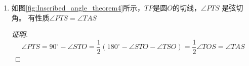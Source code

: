 \documentclass{article}
\begin{document}
\begin{enumerate}
\begin{figure}[!ht]
\begin{subfigure}[b]{0.45\textwidth}
    \caption{角平分线证明用图}\label{fig:Bisect}
    \end{subfigure}
    \end{figure}


一般的,去掉$\angle BAD = \angle DAC$的条件，在图\ref{fig:Bisect} 中有：
\[
\frac{BD}{DC}=\frac{AB\sin\angle DAB}{AC \sin\angle DAC}
\]
角平分线逆定理的证明如下：
\begin{proof}[证明]
在图\ref{fig:Bisect} 中，过$B$作$BB_1\perp AD$，垂足为$B_1$; 过$C$作$CC_1 \perp AD$,垂足为
$C_1$。因为$\triangle BB_1D \sim \triangle CC_1D$,所以$\frac{BD}{DC}=\frac{BB_1}{CC_1}$。
因为$\frac{BD}{DC}=\frac{AB}{AC}$,所以$\frac{BB_1}{CC_1}=\frac{AB}{AC}$。
即$\frac{BB_1}{AB}=\frac{CC_1}{AC}\Rightarrow \sin\angle BAD = \sin \angle CAD$。
因为$\angle BAD,\angle CAD$都是锐角，所以$\angle BAD=\angle CAD$。
\end{proof}
\begin{proof}[另证]
$$\frac{BD}{DC}=\frac{S_{\triangle ABD}}{S_{\triangle ADC}}=\frac{AB\cdot AD \cdot \sin\angle BAD}
{AC\cdot AD\cdot \sin\angle DAC}=\frac{AB}{AC}$$
\end{proof}
\textbf{作业：}证明角平分线定理。即在图\ref{fig:Triangle_ABC_with_bisector_AD} 中，已知
$\angle BAD = \angle DAC$,证明$\frac{BD}{DC}=\frac{AB}{AC}$。
\item 如图\ref{fig:Inscribed_angle_theorem4}所示，$TP$是圆$O$的切线，$\angle PTS$ 是弦切角。
有性质$\angle PTS=\angle TAS$
\begin{proof}[证明]
$$
\angle PTS = 90^{\circ}-\angle STO =\frac{1}{2}(180^{\circ}-\angle STO -\angle TSO)=\frac{1}{2}\angle TOS
=\angle TAS
$$
\end{proof}
    \begin{figure}[!ht]
    \centering
    \begin{subfigure}[b]{0.45\textwidth}

\end{subfigure}
\end{figure}
\end{enumerate}
\end{document}
